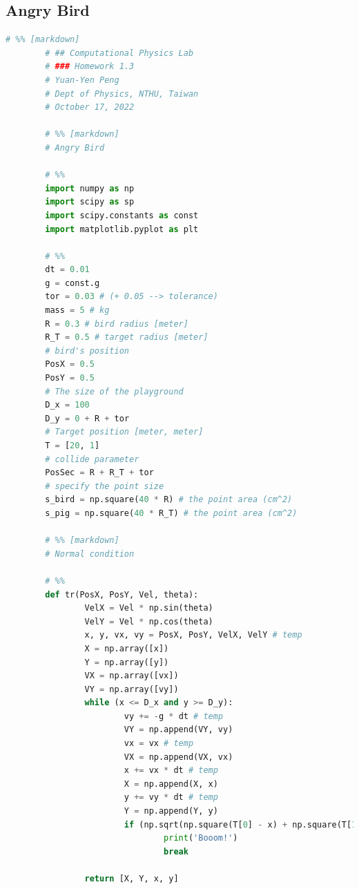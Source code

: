 \documentclass[12pt]{article}
\begin{document}
    \subsection{Angry Bird}
      \begin{lstlisting}[language={Python}]
        # %% [markdown]
        # ## Computational Physics Lab 
        # ### Homework 1.3
        # Yuan-Yen Peng   
        # Dept of Physics, NTHU, Taiwan   
        # October 17, 2022   
        
        # %% [markdown]
        # Angry Bird
        
        # %%
        import numpy as np
        import scipy as sp
        import scipy.constants as const
        import matplotlib.pyplot as plt
        
        # %%
        dt = 0.01
        g = const.g
        tor = 0.03 # (+ 0.05 --> tolerance)
        mass = 5 # kg
        R = 0.3 # bird radius [meter]
        R_T = 0.5 # target radius [meter]
        # bird's position
        PosX = 0.5
        PosY = 0.5
        # The size of the playground
        D_x = 100
        D_y = 0 + R + tor
        # Target position [meter, meter]
        T = [20, 1]
        # collide parameter
        PosSec = R + R_T + tor 
        # specify the point size
        s_bird = np.square(40 * R) # the point area (cm^2)
        s_pig = np.square(40 * R_T) # the point area (cm^2)
        
        # %% [markdown]
        # Normal condition
        
        # %%
        def tr(PosX, PosY, Vel, theta):
                VelX = Vel * np.sin(theta)
                VelY = Vel * np.cos(theta)
                x, y, vx, vy = PosX, PosY, VelX, VelY # temp
                X = np.array([x])
                Y = np.array([y])
                VX = np.array([vx])
                VY = np.array([vy])
                while (x <= D_x and y >= D_y):
                        vy += -g * dt # temp
                        VY = np.append(VY, vy)
                        vx = vx # temp
                        VX = np.append(VX, vx)
                        x += vx * dt # temp
                        X = np.append(X, x)
                        y += vy * dt # temp
                        Y = np.append(Y, y)
                        if (np.sqrt(np.square(T[0] - x) + np.square(T[1] - y)) <= PosSec):
                                print('Booom!')
                                break
                        
                return [X, Y, x, y]
        

\end{lstlisting}
\end{document}
